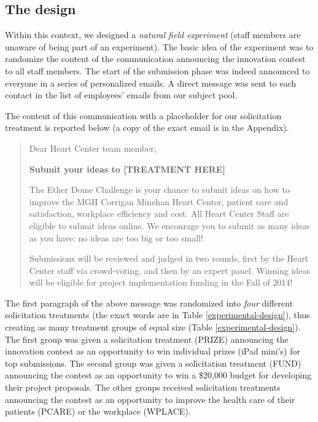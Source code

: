 \documentclass[12pt, titlepage]{article}
\begin{document}
\subsection{The design}\label{the-design}

Within this context, we designed a \emph{natural field experiment}
(staff members are unaware of being part of an experiment). The basic
idea of the experiment was to randomize the content of the communication
announcing the innovation contest to all staff members. The start of the
submission phase was indeed announced to everyone in a series of
personalized emails. A direct message was sent to each contact in the
list of employees' emails from our subject pool.

The content of this communication with a placeholder for our
solicitation treatment is reported below (a copy of the exact email is
in the Appendix).

\begin{quote}
Dear Heart Center team member,

\textbf{Submit your ideas to {[}TREATMENT HERE{]}}

The Ether Dome Challenge is your chance to submit ideas on how to
improve the MGH Corrigan Minehan Heart Center, patient care and
satisfaction, workplace efficiency and cost. All Heart Center Staff are
eligible to submit ideas online. We encourage you to submit as many
ideas as you have: no ideas are too big or too small!

Submissions will be reviewed and judged in two rounds, first by the
Heart Center staff via crowd-voting, and then by an expert panel.
Winning ideas will be eligible for project implementation funding in the
Fall of 2014!
\end{quote}

The first paragraph of the above message was randomized into \emph{four}
different solicitation treatments (the exact words are in Table
\ref{experimental-design}), thus creating as many treatment groups of
equal size (Table \ref{experimental-design}). The first group was given
a solicitation treatment (PRIZE) announcing the innovation contest as an
opportunity to win individual prizes (iPad mini's) for top submissions.
The second group was given a solicitation treatment (FUND) announcing
the contest as an opportunity to win a \$20,000 budget for developing
their project proposals. The other groups received solicitation
treatments announcing the contest as an opportunity to improve the
health care of their patients (PCARE) or the workplace (WPLACE).
\end{document}
